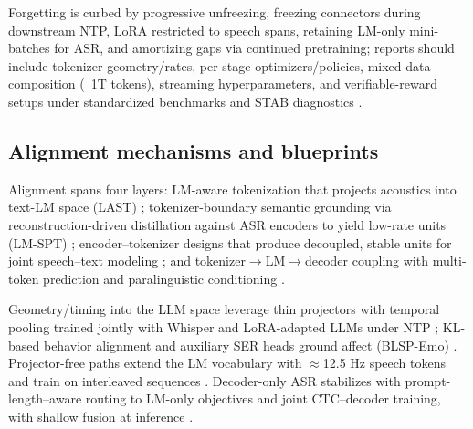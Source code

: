 \documentclass{article}
\begin{document}
Forgetting is curbed by progressive unfreezing, freezing connectors during downstream NTP, LoRA restricted to speech spans, retaining LM-only mini-batches for ASR, and amortizing gaps via continued pretraining; reports should include tokenizer geometry/rates, per-stage optimizers/policies, mixed-data composition (~1T tokens), streaming hyperparameters, and verifiable-reward setups under standardized benchmarks and STAB diagnostics \cite{nguyen2025qwenvsgemmaintegrationwhispercomparative,hsu2024exploringcontextlearningtextlessspeechla,zeng2024scalingspeechtextpretrainingsyntheticint,vashishth2024stabspeechtokenizerassessmentbenchmark,entry2025indicsuperbspeechprocessinguniversalperf,sadok2025vectorquantizedmaskedautoencoderaudiovis,wang2025tadicodectextawarediffusionspeechtokeniz}.

\subsection{Alignment mechanisms and blueprints} \label{subsec:Alignment mechanisms and blueprints}
Alignment spans four layers: LM-aware tokenization that projects acoustics into text-LM space (LAST) \cite{turetzky2024lastlanguagemodelawarespeechtokenization}; tokenizer-boundary semantic grounding via reconstruction-driven distillation against ASR encoders to yield low-rate units (LM-SPT) \cite{jo2025lmsptalignedsemanticdistillationspeechto}; encoder--tokenizer designs that produce decoupled, stable units for joint speech--text modeling \cite{entry2025towardjointlanguagemodelingspeechunitste}; and tokenizer$\rightarrow$LM$\rightarrow$decoder coupling with multi-token prediction and paralinguistic conditioning \cite{fan2025whatmakesgoodspeechtokenizerllmcentricge,wang2025incorporatingcontextualparalinguisticund}.

Geometry/timing into the LLM space leverage thin projectors with temporal pooling trained jointly with Whisper and LoRA-adapted LLMs under NTP \cite{nguyen2025qwenvsgemmaintegrationwhispercomparative}; KL-based behavior alignment and auxiliary SER heads ground affect (BLSP-Emo) \cite{wang2024blspemotowardsempatheticlargespeechlangu}. Projector-free paths extend the LM vocabulary with $\approx$12.5 Hz speech tokens and train on interleaved sequences \cite{zeng2024scalingspeechtextpretrainingsyntheticint}. Decoder-only ASR stabilizes with prompt-length--aware routing to LM-only objectives and joint CTC--decoder training, with shallow fusion at inference \cite{tsunoo2024decoderonlyarchitecturespeechrecognition}.
\end{document}
